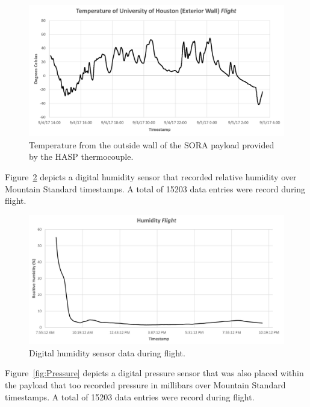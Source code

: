 \begin{figure}[H]
\centering
\includegraphics[width=\textwidth, keepaspectratio]{./Figures/hasp-thermal-couple.png}
\caption{Temperature from the outside wall of the SORA payload provided by the HASP thermocouple.}
\label{fig:Thermal-Couple} 
\end{figure}

Figure~\ref{fig:Humidity} depicts a digital humidity sensor that recorded relative humidity over Mountain Standard timestamps.  A total of \num{15203} data entries were record during flight.

\begin{figure}[h]
\centering
\includegraphics[width=\textwidth]{./Figures/humidity.jpg}
\caption{Digital humidity sensor data during flight.}
\label{fig:Humidity} 
\end{figure}
\clearpage
Figure~\ref{fig:Pressure} depicts a digital pressure sensor that was also placed within the payload that too recorded pressure in millibars over Mountain Standard timestamps.  A total of \num{15203} data entries were record during flight.

